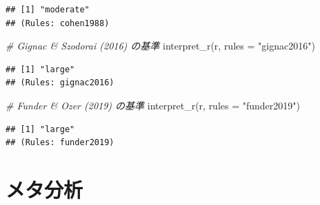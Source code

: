 \documentclass[
  ja=standard, xelatex, base=12pt]{bxjsreport}
\newenvironment{Shaded}{\begin{snugshade}}{\end{snugshade}}
\newcommand{\AttributeTok}[1]{\textcolor[rgb]{0.77,0.63,0.00}{#1}}
\newcommand{\CommentTok}[1]{\textcolor[rgb]{0.56,0.35,0.01}{\textit{#1}}}
\newcommand{\FunctionTok}[1]{\textcolor[rgb]{0.00,0.00,0.00}{#1}}
\newcommand{\NormalTok}[1]{#1}
\newcommand{\StringTok}[1]{\textcolor[rgb]{0.31,0.60,0.02}{#1}}
\begin{document}
\begin{verbatim}
## [1] "moderate"
## (Rules: cohen1988)
\end{verbatim}

\begin{Shaded}
\begin{Highlighting}[]
\CommentTok{\# Gignac \& Szodorai (2016) の基準}
\FunctionTok{interpret\_r}\NormalTok{(r, }\AttributeTok{rules =} \StringTok{"gignac2016"}\NormalTok{)}
\end{Highlighting}
\end{Shaded}

\begin{verbatim}
## [1] "large"
## (Rules: gignac2016)
\end{verbatim}

\begin{Shaded}
\begin{Highlighting}[]
\CommentTok{\# Funder \& Ozer (2019) の基準}
\FunctionTok{interpret\_r}\NormalTok{(r, }\AttributeTok{rules =} \StringTok{"funder2019"}\NormalTok{)}
\end{Highlighting}
\end{Shaded}

\begin{verbatim}
## [1] "large"
## (Rules: funder2019)
\end{verbatim}

\hypertarget{ux30e1ux30bfux5206ux6790}{%
\chapter{メタ分析}\label{ux30e1ux30bfux5206ux6790}}
\end{document}
